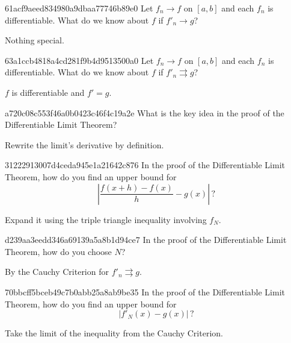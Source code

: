 \begin{note}{61acf9aeed834980a9dbaa77746b89e0}
    Let \({ f_n \to f }\) on \({ [a, b] }\) and each \({ f_n }\) is differentiable.
    What do we know about \({ f }\) if \({ f'_n \to g }\)?

    \begin{cloze}{1}
        Nothing special.
    \end{cloze}
\end{note}

\begin{note}{63a1ccb4818a4cd281f9b4d9513500a0}
    Let \({ f_n \to f }\) on \({ [a, b] }\) and each \({ f_n }\) is differentiable.
    What do we know about \({ f }\) if \({ f'_n \rightrightarrows g }\)?

    \begin{cloze}{1}
        \({ f }\) is differentiable and \({ f' = g }\).
    \end{cloze}
\end{note}

\begin{note}{a720c08c553f46a0b0423c46f4c19a2e}
    What is the key idea in the proof of the Differentiable Limit Theorem?

    \begin{cloze}{1}
        Rewrite the limit's derivative by definition.
    \end{cloze}
\end{note}

\begin{note}{31222913007d4ceda945e1a21642c876}
    In the proof of the Differentiable Limit Theorem, how do you find an upper bound for
    \[
        \left\lvert \frac{f(x + h) - f(x)}{h} - g(x) \right\rvert\,?
    \]

    \begin{cloze}{1}
        Expand it using the triple triangle inequality involving \({ f_N }\).
    \end{cloze}
\end{note}

\begin{note}{d239aa3eedd346a69139a5a8b1d94ce7}
    In the proof of the Differentiable Limit Theorem, how do you choose \({ N }\)?

    \begin{cloze}{1}
        By the Cauchy Criterion for \({ f'_n \rightrightarrows g }\).
    \end{cloze}
\end{note}

\begin{note}{70bbcff5bceb49c7b0abb25a8ab9be35}
    In the proof of the Differentiable Limit Theorem, how do you find an upper bound for
    \[
        \left\lvert f'_N(x) - g(x) \right\rvert\,?
    \]

    \begin{cloze}{1}
        Take the limit of the inequality from the Cauchy Criterion.
    \end{cloze}
\end{note}

